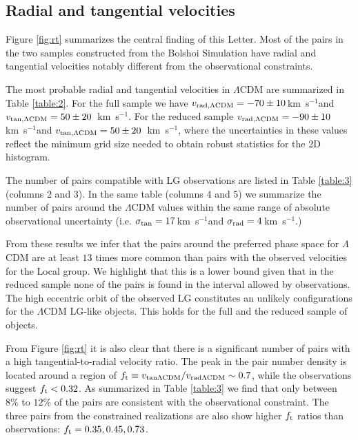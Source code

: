 \documentclass{emulateapj}
\newcommand{\kms}{\,km~s$^{-1}$}
\begin{document}
\subsection{Radial and tangential velocities}

Figure \ref{fig:rt} summarizes the central finding of this
Letter. Most of the pairs in the two samples constructed from the
Bolshoi Simulation have radial and tangential velocities notably
different from the observational constraints.   

The most probable radial and tangential velocities in $\Lambda$CDM are
summarized in Table \ref{table:2}. For the full sample we have $v_{\rm
  rad,\Lambda CDM} = -70\pm10$\kms and $v_{\rm tan,\Lambda CDM} =
50\pm20$ \kms. For the reduced sample $v_{\rm
  rad,\Lambda CDM} = -90\pm10$\kms and $v_{\rm tan,\Lambda CDM} =
50\pm20$ \kms, where the uncertainties in these values reflect
the minimum grid size needed to obtain robust statistics for the 2D
histogram. 

The number of pairs compatible with LG observations are listed in
Table \ref{table:3} (columns 2 and 3). In the same table (columns 4
and 5) we summarize the number of pairs around the $\Lambda$CDM values
within the same range of absolute observational uncertainty
(i.e. $\sigma_{\rm tan}=17$\kms and $\sigma_{\rm rad}=4$\kms.) 

From these results we infer that the pairs around the preferred phase
space for $\Lambda$CDM are at least $13$ times more common than pairs
with the observed velocities for the Local group. We highlight that
this is a lower bound given that in the reduced sample none of the
pairs is found in the interval allowed by observations. The high
eccentric orbit of the observed LG  constitutes an unlikely
configurations for the $\Lambda$CDM LG-like objects. This holds for
the full and the reduced sample of objects. 


From Figure \ref{fig:rt} it is also clear that there is a significant
number of pairs with a high tangential-to-radial velocity ratio. The
peak in the pair number density is located around a region of $f_{\rm
  t}\equiv v_{\rm tan \Lambda CDM}/v_{\rm rad \Lambda CDM}\sim 0.7$,
while the observations suggest $f_{\rm t}<0.32$. As summarized in Table
\ref{table:3} we find that only between $8\%$ to $12\%$ of the pairs are
consistent with the observational constraint. The three
pairs from the constrained realizations are also show higher $f_{\rm
  t}$ ratios than observations: $f_{\rm t}= 0.35, 0.45, 0.73$. 
\end{document}
